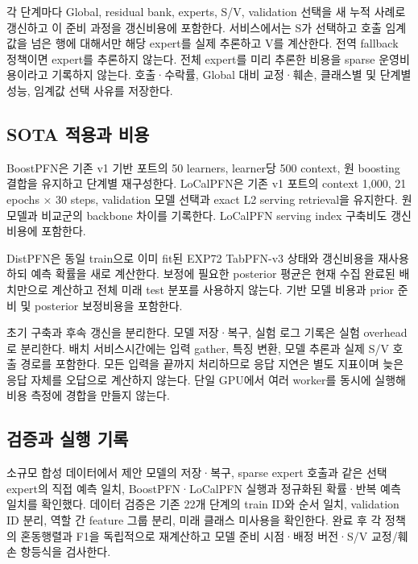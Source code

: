 각 단계마다 Global, residual bank, experts, S/\allowbreak{}V, validation 선택을 새 누적 사례로 갱신하고 이 준비 과정을 갱신비용에 포함한다. 서비스에서는 S가 선택하고 호출 임계값을 넘은 행에 대해서만 해당 expert를 실제 추론하고 V를 계산한다. 전역 fallback 정책이면 expert를 추론하지 않는다. 전체 expert를 미리 추론한 비용을 sparse 운영비용이라고 기록하지 않는다. 호출·수락률, Global 대비 교정·훼손, 클래스별 및 단계별 성능, 임계값 선택 사유를 저장한다.

\subsection{SOTA 적용과 비용}
BoostPFN은 기존 v1 기반 포트의 50 learners, learner당 500 context, 원 boosting 결합을 유지하고 단계별 재구성한다. LoCalPFN은 기존 v1 포트의 context 1,000, 21 epochs × 30 steps, validation 모델 선택과 exact L2 serving retrieval을 유지한다. 원 모델과 비교군의 backbone 차이를 기록한다. LoCalPFN serving index 구축비도 갱신비용에 포함한다.

DistPFN은 동일 train으로 이미 fit된 EXP72 TabPFN-v3 상태와 갱신비용을 재사용하되 예측 확률을 새로 계산한다. 보정에 필요한 posterior 평균은 현재 수집 완료된 배치만으로 계산하고 전체 미래 test 분포를 사용하지 않는다. 기반 모델 비용과 prior 준비 및 posterior 보정비용을 포함한다.

초기 구축과 후속 갱신을 분리한다. 모델 저장·복구, 실험 로그 기록은 실험 overhead로 분리한다. 배치 서비스시간에는 입력 gather, 특징 변환, 모델 추론과 실제 S/\allowbreak{}V 호출 경로를 포함한다. 모든 입력을 끝까지 처리하므로 응답 지연은 별도 지표이며 늦은 응답 자체를 오답으로 계산하지 않는다. 단일 GPU에서 여러 worker를 동시에 실행해 비용 측정에 경합을 만들지 않는다.

\subsection{검증과 실행 기록}
소규모 합성 데이터에서 제안 모델의 저장·복구, sparse expert 호출과 같은 선택 expert의 직접 예측 일치, BoostPFN·LoCalPFN 실행과 정규화된 확률·반복 예측 일치를 확인했다. 데이터 검증은 기존 22개 단계의 train ID와 순서 일치, validation ID 분리, 역할 간 feature 그룹 분리, 미래 클래스 미사용을 확인한다. 완료 후 각 정책의 혼동행렬과 F1을 독립적으로 재계산하고 모델 준비 시점·배정 버전·S/\allowbreak{}V 교정/\allowbreak{}훼손 항등식을 검사한다.

